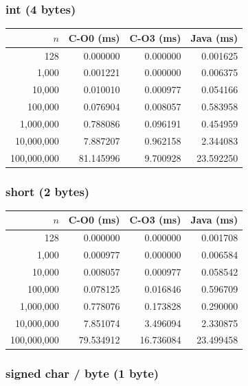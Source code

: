 \documentclass[12pt,a4paper]{article}
\begin{document}
\subsubsection*{int (4 bytes)}

\begin{table}[H]
\centering
\begin{tabular}{r r r r}
\toprule
$n$ & C-O0 (ms) & C-O3 (ms) & Java (ms) \\
\midrule
128         & 0.000000 & 0.000000 & 0.001625 \\
1{,}000     & 0.001221 & 0.000000 & 0.006375 \\
10{,}000    & 0.010010 & 0.000977 & 0.054166 \\
100{,}000   & 0.076904 & 0.008057 & 0.583958 \\
1{,}000{,}000   & 0.788086 & 0.096191 & 0.454959 \\
10{,}000{,}000  & 7.887207 & 0.962158 & 2.344083 \\
100{,}000{,}000 & 81.145996 & 9.700928 & 23.592250 \\
\bottomrule
\end{tabular}
\end{table}

\subsubsection*{short (2 bytes)}

\begin{table}[H]
\centering
\begin{tabular}{r r r r}
\toprule
$n$ & C-O0 (ms) & C-O3 (ms) & Java (ms) \\
\midrule
128         & 0.000000 & 0.000000 & 0.001708 \\
1{,}000     & 0.000977 & 0.000000 & 0.006584 \\
10{,}000    & 0.008057 & 0.000977 & 0.058542 \\
100{,}000   & 0.078125 & 0.016846 & 0.596709 \\
1{,}000{,}000   & 0.778076 & 0.173828 & 0.290000 \\
10{,}000{,}000  & 7.851074 & 3.496094 & 2.330875 \\
100{,}000{,}000 & 79.534912 & 16.736084 & 23.499458 \\
\bottomrule
\end{tabular}
\end{table}

\subsubsection*{signed char / byte (1 byte)}
\end{document}

